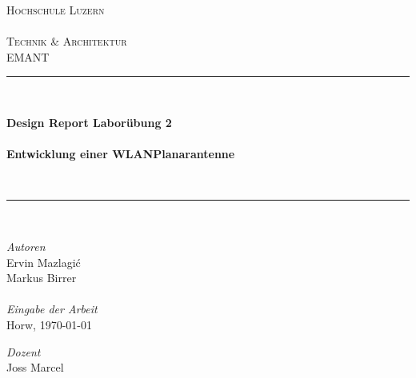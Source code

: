 \thispagestyle{empty}
\begin{titlepage}

\begin{center}

\textsc{
	\LARGE Hochschule Luzern\\~\\Technik \& Architektur}\\[1.5cm]
\vfill{}
\large EMANT
\\[0.5cm]
\newcommand{\HRule}{\rule{\linewidth}{0.5mm}}
\HRule
\\[0.4cm]
{

	\Huge \bfseries Design Report Laborübung 2\\
        ~\\
        \large Entwicklung einer WLAN\texttrademark  Planarantenne}
\\[0.4cm]
\HRule
\\[0.5cm]


\vfill{}

\begin{minipage}{0.4\textwidth}
    \begin{flushleft} \large
	\emph{Autoren}\\
        Ervin Mazlagi\'c\\
        Markus Birrer\\ ~ \\
	\emph{Eingabe der Arbeit}\\
	Horw, \today
    \end{flushleft}
\end{minipage}
\hfill
\begin{minipage}{0.4\textwidth}
    \begin{flushright} \large
        \emph{Dozent} \\
        Joss Marcel
    \end{flushright}
\end{minipage}


\end{center}
\end{titlepage}
